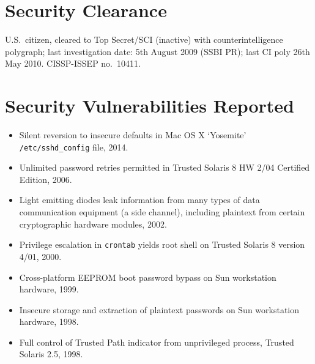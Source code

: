 \documentclass[12pt,twoside,letterpaper]{article}
\begin{document}
\vspace{-8mm}
\section*{Security Clearance}
\vspace{-2mm}

U.S.\ citizen, cleared to Top Secret/SCI (inactive) with
counterintelligence polygraph; last investigation date: 5th August 2009
(SSBI PR); last CI poly 26th May 2010. CISSP-ISSEP no.\ 10411.

\setlength{\fboxsep}{0pt}

\vspace{-6mm}
\section*{Security Vulnerabilities Reported}
\vspace{-2mm}

\begin{itemize}
    \item Silent reversion to insecure defaults in Mac OS X `Yosemite'
        \texttt{/etc/sshd\_config} file, 2014.\vspace{-2.5mm}
	\item Unlimited password retries permitted in Trusted Solaris 8 HW 2/04
		Certified Edition, 2006.\vspace{-2.5mm}
	\item Light emitting diodes leak information from many types of data
		communication equipment (a side channel), including plaintext from
		certain cryptographic hardware modules, 2002.\vspace{-2.5mm}
	\item Privilege escalation in \verb,crontab, yields root shell on Trusted
		Solaris 8 version 4/01, 2000.\vspace{-2.5mm}
	\item Cross-platform EEPROM boot password bypass on Sun workstation
		hardware, 1999.\vspace{-2.5mm}
	\item Insecure storage and extraction of plaintext passwords on Sun workstation
		hardware, 1998.\vspace{-2.5mm}
	\item Full control of Trusted Path indicator from unprivileged process,
		Trusted Solaris 2.5, 1998.\vspace{-2.5mm}
\end{itemize}
\end{document}
